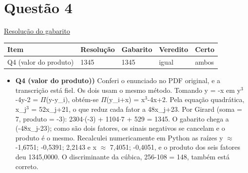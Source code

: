 \documentclass{article}%
\begin{document}
\section*{Questão 4}%
\href{https://poliedroresolve.sistemapoliedro.com.br/vestibulares/ime/2027/ime-2-fase-dia-1-26-10-2026-2-fase-dia-1/dissertativa-4-matematica-2-fase-dia-1-ime-2027}{Resolução do gabarito}\par\smallskip%
\begin{longtable}{@{}p{} p{} p{} p{} p{}@{}}\toprule Item & Resolução & Gabarito & Veredito & Certo \\ \midrule
Q4 (valor do produto) & 1345 & 1345 & igual & ambos \\
\bottomrule\end{longtable}%
\begin{itemize}%
\item%
\textbf{Q4 (valor do produto))} Conferi o enunciado no PDF original, e a transcrição está fiel. Os dois usam o mesmo método. Tomando y = {-}x em y$^3${-}4y{-}2 = $\Pi$(y{-}y\_i), obtém{-}se $\Pi$(y\_i+x) = x$^3${-}4x+2. Pela equação quadrática, x\_j$^3$ = 52x\_j+21, o que reduz cada fator a 48x\_j+23. Por Girard (soma = 7, produto = {-}3): 2304$\cdot$({-}3) + 1104$\cdot$7 + 529 = 1345. O gabarito chega a ({-}48x\_j{-}23); como são dois fatores, os sinais negativos se cancelam e o produto é o mesmo. Recalculei numericamente em Python as raízes y $\approx$ {-}1,6751; {-}0,5391; 2,2143 e x $\approx$ 7,4051; {-}0,4051, e o produto dos seis fatores deu 1345,0000. O discriminante da cúbica, 256{-}108 = 148, também está correto.%
\end{itemize}%
\end{document}

